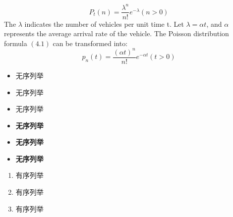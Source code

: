 \begin{equation}
{P_t}(n) = \frac{{{\lambda ^n}}}{{n!}}{e^{ - \lambda }}(n > 0)
\end{equation}
The $\lambda$ indicates the number of vehicles per unit time t. Let $ \lambda = \alpha t $, and $\alpha$ represents the average arrival rate of the vehicle. The Poisson distribution formula $(4.1)$ can be transformed into:
\begin{equation}
{p_n}(t) = \frac{{{{(\alpha t)}^n}}}{{n!}}{e^{ - \alpha t}}(t > 0)
\end{equation}

\begin{itemize}
	\item  无序列举
	\item  无序列举
	\item  无序列举
\end{itemize}


\begin{itemize}
	\item \textbf{无序列举}
	\item \textbf{无序列举}
	\item \textbf{无序列举}
\end{itemize}

\begin{enumerate}
	\item  有序列举
	\item  有序列举
	\item  有序列举
\end{enumerate}
























